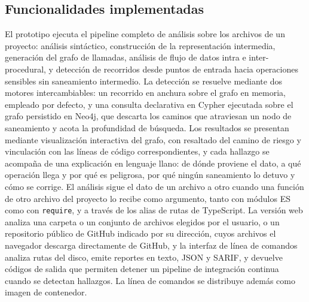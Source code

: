 \subsection{Funcionalidades implementadas}\label{sec:n4.2.2}

El prototipo ejecuta el pipeline completo de análisis sobre los archivos de un proyecto: análisis sintáctico, construcción de la representación intermedia, generación del grafo de llamadas, análisis de flujo de datos intra e inter-procedural, y detección de recorridos desde puntos de entrada hacia operaciones sensibles sin saneamiento intermedio. La detección se resuelve mediante dos motores intercambiables: un recorrido en anchura sobre el grafo en memoria, empleado por defecto, y una consulta declarativa en Cypher ejecutada sobre el grafo persistido en Neo4j, que descarta los caminos que atraviesan un nodo de saneamiento y acota la profundidad de búsqueda. Los resultados se presentan mediante visualización interactiva del grafo, con resaltado del camino de riesgo y vinculación con las líneas de código correspondientes, y cada hallazgo se acompaña de una explicación en lenguaje llano: de dónde proviene el dato, a qué operación llega y por qué es peligrosa, por qué ningún saneamiento lo detuvo y cómo se corrige. El análisis sigue el dato de un archivo a otro cuando una función de otro archivo del proyecto lo recibe como argumento, tanto con módulos ES como con \texttt{require}, y a través de los alias de rutas de TypeScript. La versión web analiza una carpeta o un conjunto de archivos elegidos por el usuario, o un repositorio público de GitHub indicado por su dirección, cuyos archivos el navegador descarga directamente de GitHub, y la interfaz de línea de comandos analiza rutas del disco, emite reportes en texto, JSON y SARIF, y devuelve códigos de salida que permiten detener un pipeline de integración continua cuando se detectan hallazgos. La línea de comandos se distribuye además como imagen de contenedor.

